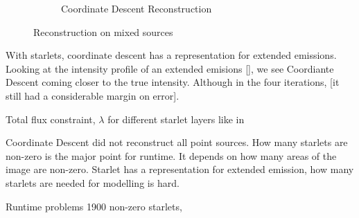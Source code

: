 \begin{figure}[h]
\begin{subfigure}[b]{0.4\linewidth}
		\caption{Coordinate Descent Reconstruction}
		\label{results:mixed:cd}
	\end{subfigure}
	\caption{Reconstruction on mixed sources}
	\label{results:mixed}
\end{figure}

With starlets, coordinate descent has a representation for extended emissions. Looking at the intensity profile of an extended emisions \ref{}, we see Coordiante Descent coming closer to the true intensity. Although in the four iterations,  [it still had a considerable margin on error]. 

Total flux constraint, $\lambda$ for different starlet layers like in \cite{girard2015sparse}

Coordinate Descent did not reconstruct all point sources. How many starlets are non-zero is the major point for runtime. It depends on how many areas of the image are non-zero. Starlet has a representation for extended emission, how many starlets are needed for modelling is hard.

Runtime problems
1900 non-zero starlets, 